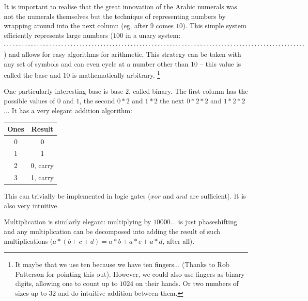 It is important to realise that the great innovation of the Arabic numerals was not the numerals themselves but the technique of representing numbers by wrapping around into the next column (eg. after $9$ comes $10$). This simple system efficiently represents large numbers ($100$ in a unary system: $\cdot\cdot\cdot\cdot\cdot\cdot\cdot\cdot\cdot\cdot\cdot\cdot\cdot\cdot\cdot\cdot\cdot\cdot\cdot\cdot\cdot\cdot\cdot\cdot\cdot\cdot\cdot\cdot\cdot\cdot\cdot\cdot\cdot\cdot\cdot\cdot\cdot\cdot\cdot\cdot\cdot\cdot\cdot\cdot\cdot\cdot\cdot\cdot\cdot\cdot\cdot\cdot\cdot\cdot\cdot\cdot\cdot\cdot\cdot\cdot\cdot\cdot\cdot\cdot\cdot\cdot\cdot\cdot\cdot\cdot\cdot\cdot\cdot\cdot\cdot\cdot\cdot\cdot\cdot\cdot\cdot\cdot\cdot\cdot\cdot\cdot\cdot\cdot\cdot\cdot\cdot\cdot\cdot\cdot\cdot\cdot\cdot\cdot\cdot\cdot$) and allows for easy algorithms for arithmetic. This strategy can be taken with any set of symbols and can even cycle at a number other than $10$ -- this value is called the base and $10$ is mathematically arbitrary. \footnote{It maybe that we use ten because we have ten fingers... (Thanks to Rob Patterson for pointing this out). However, we could also use fingers as binary digits, allowing one to count up to $1024$ on their hands. Or two numbers of sizes up to $32$ and do intuitive addition between them.}

One particularly interesting base is base $2$, called binary. The first column has the possible values of $0$ and $1$, the second $0*2$ and $1*2$ the next $0*2*2$ and $1*2*2$... It has a very elegant addition algorithm: \\

\begin{center}
\begin{tabular}{|c|c|} \hline
Ones & Result\\ \hline
0& 0\\ \hline
1& 1\\ \hline
2& 0, carry\\ \hline
3& 1, carry\\ \hline
\end{tabular}
\end{center}

This can trivially be implemented in logic gates ($xor$ and $and$ are sufficient). It is also very intuitive.

Multiplication is similarly elegant: multiplying by $10000...$ is just phaseshifting and any multiplication can be decomposed into adding the result of such multiplications ($a*(b+c+d)=a*b+a*c+a*d$, after all).

